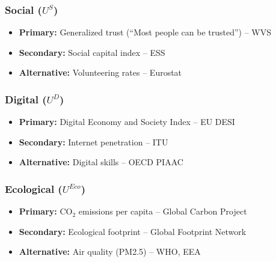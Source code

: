 \subsubsection{Social ($U^S$)}

\begin{itemize}[nosep]
    \item \textbf{Primary:} Generalized trust (``Most people can be trusted'') -- WVS
    \item \textbf{Secondary:} Social capital index -- ESS
    \item \textbf{Alternative:} Volunteering rates -- Eurostat
\end{itemize}

\subsubsection{Digital ($U^D$)}

\begin{itemize}[nosep]
    \item \textbf{Primary:} Digital Economy and Society Index -- EU DESI
    \item \textbf{Secondary:} Internet penetration -- ITU
    \item \textbf{Alternative:} Digital skills -- OECD PIAAC
\end{itemize}

\subsubsection{Ecological ($U^{Eco}$)}

\begin{itemize}[nosep]
    \item \textbf{Primary:} CO$_2$ emissions per capita -- Global Carbon Project
    \item \textbf{Secondary:} Ecological footprint -- Global Footprint Network
    \item \textbf{Alternative:} Air quality (PM2.5) -- WHO, EEA
\end{itemize}



